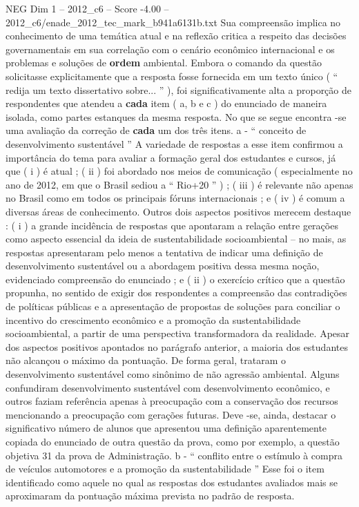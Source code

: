 \begin{textsample}{NEG Dim 1 – 2012\_c6 – Score -4.00 – 2012\_c6/enade\_2012\_tec\_mark\_b941a6131b.txt}
Sua compreensão implica no conhecimento de uma temática atual e na reflexão critica a respeito das decisões governamentais em sua correlação com o cenário econômico internacional e os problemas e soluções de \textbf{ordem} ambiental.
Embora o comando da questão solicitasse explicitamente que a resposta fosse fornecida em um texto único ( “ redija um texto dissertativo sobre... ” ), foi significativamente alta a proporção de respondentes que atendeu a \textbf{cada} item ( a, b e c ) do enunciado de maneira isolada, como partes estanques da mesma resposta.
No que se segue encontra -se uma avaliação da correção de \textbf{cada} um dos três itens. a - “ conceito de desenvolvimento sustentável ” A variedade de respostas a esse item confirmou a importância do tema para avaliar a formação geral dos estudantes e cursos, já que ( i ) é atual ; ( ii ) foi abordado nos meios de comunicação ( especialmente no ano de 2012, em que o Brasil sediou a “ Rio+20 ” ) ; ( iii ) é relevante não apenas no Brasil como em todos os principais fóruns internacionais ; e ( iv ) é comum a diversas áreas de conhecimento.
Outros dois aspectos positivos merecem destaque : ( i ) a grande incidência de respostas que apontaram a relação entre gerações como aspecto essencial da ideia de sustentabilidade socioambiental – no mais, as respostas apresentaram pelo menos a tentativa de indicar uma definição de desenvolvimento sustentável ou a abordagem positiva dessa mesma noção, evidenciado compreensão do enunciado ; e ( ii ) o exercício crítico que a questão propunha, no sentido de exigir dos respondentes a compreensão das contradições de políticas públicas e a apresentação de propostas de soluções para conciliar o incentivo do crescimento econômico e a promoção da sustentabilidade socioambiental, a partir de uma perspectiva transformadora da realidade.
Apesar dos aspectos positivos apontados no parágrafo anterior, a maioria dos estudantes não alcançou o máximo da pontuação.
De forma geral, trataram o desenvolvimento sustentável como sinônimo de não agressão ambiental.
Alguns confundiram desenvolvimento sustentável com desenvolvimento econômico, e outros faziam referência apenas à preocupação com a conservação dos recursos mencionando a preocupação com gerações futuras.
Deve -se, ainda, destacar o significativo número de alunos que apresentou uma definição aparentemente copiada do enunciado de outra questão da prova, como por exemplo, a questão objetiva 31 da prova de Administração. b - “ conflito entre o estímulo à compra de veículos automotores e a promoção da sustentabilidade ” Esse foi o item identificado como aquele no qual as respostas dos estudantes avaliados mais se aproximaram da pontuação máxima prevista no padrão de resposta.

\end{textsample}
